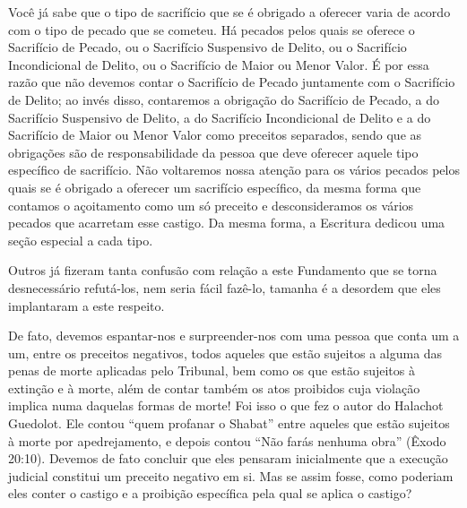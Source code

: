 Você já sabe que o tipo de sacrifício que se é obrigado a oferecer varia
de acordo com o tipo de pecado que se cometeu. Há pecados pelos quais se
oferece o Sacrifício de Pecado, ou o Sacrifício Suspensivo de Delito, ou
o Sacrifício Incondicional de Delito, ou o Sacrifício de Maior ou Menor
Valor.
É por essa razão que não devemos contar o Sacrifício de Pecado
juntamente com o Sacrifício de Delito; ao invés disso, contaremos a
obrigação do Sacrifício de Pecado, a do Sacrifício Suspensivo de
Delito, a do Sacrifício Incondicional de Delito e a do Sacrifício de
Maior ou Menor Valor como preceitos separados, sendo que as obrigações
são de responsabilidade da pessoa que deve oferecer aquele tipo
específico de sacrifício. Não voltaremos nossa atenção para os vários
pecados pelos quais se é obrigado a oferecer um sacrifício específico,
da mesma forma que contamos o açoitamento como um só preceito e
desconsideramos os vários pecados que acarretam esse castigo. Da mesma
forma, a Escritura dedicou uma seção especial a cada tipo.

Outros já fizeram tanta confusão com relação a este Fundamento que se
torna desnecessário refutá-los, nem seria fácil fazê-lo, tamanha é a
desordem que eles implantaram a este respeito.

De fato, devemos espantar-nos e surpreender-nos com uma pessoa que conta
um a um, entre os preceitos negativos, todos aqueles que estão sujeitos
a alguma das penas de morte aplicadas pelo Tribunal, bem como os que
estão sujeitos à extinção e à morte, além de contar também os atos
proibidos cuja violação implica numa daquelas formas de morte! Foi isso
o que fez o autor do Halachot Guedolot. Ele contou ``quem profanar o
Shabat'' entre aqueles que estão sujeitos à morte por apedrejamento, e
depois contou ``Não farás nenhuma obra'' (Êxodo 20:10). Devemos de fato
concluir que eles pensaram inicialmente que a execução judicial
constitui um preceito negativo em si. Mas se assim fosse, como poderiam
eles conter o castigo e a proibição específica pela qual se aplica o
castigo?

